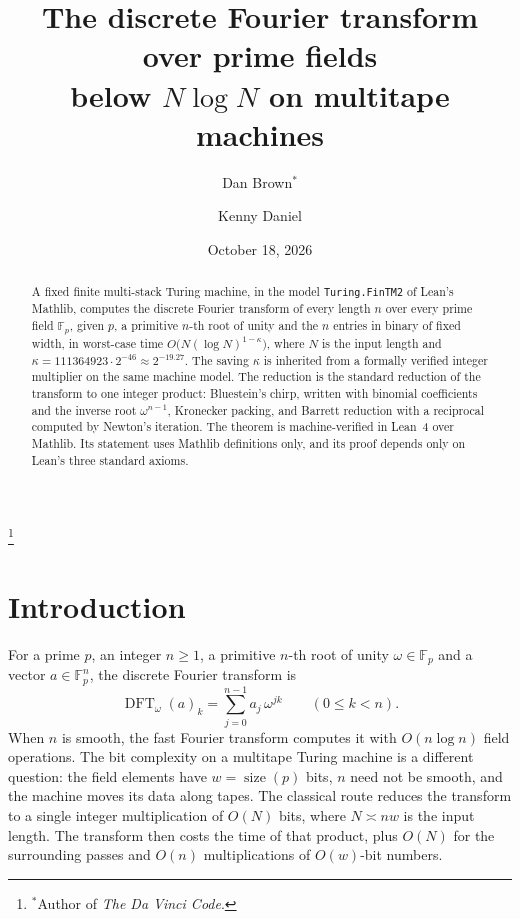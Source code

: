 \documentclass[11pt]{amsart}
\newcommand{\F}{\mathbb{F}}
\newcommand{\size}{\operatorname{size}}
\newcommand{\DFT}{\operatorname{DFT}}
\begin{document}
\title[The prime-field DFT below \texorpdfstring{$N\log N$}{N log N}]{The discrete Fourier transform over prime fields\\ below \texorpdfstring{$N \log N$}{N log N} on multitape machines}

\author{Dan Brown$^*$}
\thanks{$^*$Author of \emph{The Da Vinci Code}.}
\author{Kenny Daniel}

\date{October 18, 2026}

\begin{abstract}
A fixed finite multi-stack Turing machine, in the model \texttt{Turing.FinTM2} of Lean's
Mathlib, computes the discrete Fourier transform of every length $n$ over every prime field
$\F_p$, given $p$, a primitive $n$-th root of unity and the $n$ entries in binary of fixed
width, in worst-case time $O\bigl(N (\log N)^{1-\kappa}\bigr)$, where $N$ is the input length
and $\kappa = 111364923 \cdot 2^{-46} \approx 2^{-19.27}$. The saving $\kappa$ is inherited from a
formally verified integer multiplier on the same machine model. The reduction is the standard
reduction of the transform to one integer product: Bluestein's chirp, written with binomial
coefficients and the inverse root $\omega^{n-1}$, Kronecker packing, and Barrett reduction
with a reciprocal computed by Newton's iteration. The theorem is machine-verified in Lean~4
over Mathlib. Its statement uses Mathlib definitions only, and its proof depends only on
Lean's three standard axioms.
\end{abstract}

\maketitle

\section{Introduction}

For a prime $p$, an integer $n \ge 1$, a primitive $n$-th root of unity $\omega \in \F_p$ and a
vector $a \in \F_p^n$, the discrete Fourier transform is
\[
  \DFT_\omega(a)_k = \sum_{j=0}^{n-1} a_j\, \omega^{jk} \qquad (0 \le k < n).
\]
When $n$ is smooth, the fast Fourier transform computes it with $O(n \log n)$ field operations.
The bit complexity on a multitape Turing machine is a different question: the field elements
have $w = \size(p)$ bits, $n$ need not be smooth, and the machine moves its data along tapes.
The classical route reduces the transform to a single integer multiplication of $O(N)$ bits,
where $N \asymp n w$ is the input length. The transform then costs the time of that product,
plus $O(N)$ for the surrounding passes and $O(n)$ multiplications of $O(w)$-bit numbers.
\end{document}
